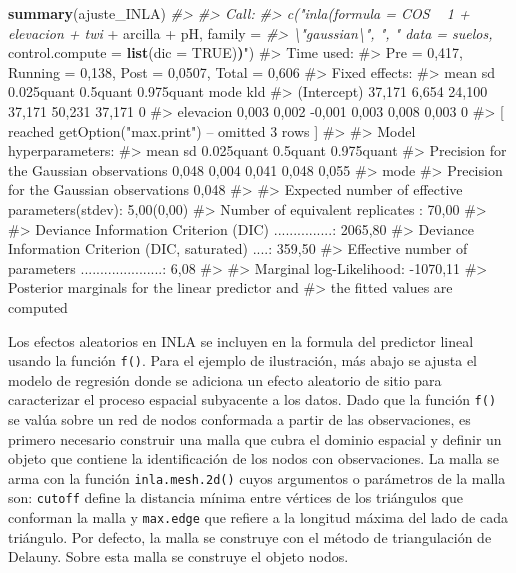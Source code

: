 \documentclass[11pt,b5paper,]{krantz}
\newenvironment{Shaded}{}{}
\newcommand{\KeywordTok}[1]{\textcolor[rgb]{0.00,0.44,0.13}{\textbf{#1}}}
\newcommand{\DataTypeTok}[1]{\textcolor[rgb]{0.56,0.13,0.00}{#1}}
\newcommand{\StringTok}[1]{\textcolor[rgb]{0.25,0.44,0.63}{#1}}
\newcommand{\CommentTok}[1]{\textcolor[rgb]{0.38,0.63,0.69}{\textit{#1}}}
\newcommand{\OtherTok}[1]{\textcolor[rgb]{0.00,0.44,0.13}{#1}}
\newcommand{\OperatorTok}[1]{\textcolor[rgb]{0.40,0.40,0.40}{#1}}
\newcommand{\ErrorTok}[1]{\textcolor[rgb]{1.00,0.00,0.00}{\textbf{#1}}}
\newcommand{\NormalTok}[1]{#1}
\begin{document}
\begin{Shaded}
\begin{Highlighting}[]
\KeywordTok{summary}\NormalTok{(ajuste_INLA)}
\CommentTok{#>}
\CommentTok{#> Call:}
\CommentTok{#> c("inla(formula = COS ~ 1 + elevacion + twi}
\OperatorTok{+}\StringTok{ }\NormalTok{arcilla }\OperatorTok{+}\StringTok{ }\NormalTok{pH, family =}
\CommentTok{#> \textbackslash{}"gaussian\textbackslash{}", ", " data = suelos,}
\NormalTok{control.compute =}\StringTok{ }\KeywordTok{list}\NormalTok{(}\DataTypeTok{dic =} \OtherTok{TRUE}\NormalTok{)}\ErrorTok{)}\StringTok{")}
\StringTok{#> Time used:}
\StringTok{#> Pre = 0,417, Running = 0,138, Post = 0,0507,}
\StringTok{Total = 0,606}
\StringTok{#> Fixed effects:}
\StringTok{#> mean sd 0.025quant 0.5quant 0.975quant mode}
\StringTok{kld}
\StringTok{#> (Intercept) 37,171 6,654 24,100 37,171}
\StringTok{50,231 37,171 0}
\StringTok{#> elevacion 0,003 0,002 -0,001 0,003 0,008}
\StringTok{0,003 0}
\StringTok{#> [ reached getOption("}\NormalTok{max.print}\StringTok{") -- omitted}
\StringTok{3 rows ]}
\StringTok{#>}
\StringTok{#> Model hyperparameters:}
\StringTok{#> mean sd 0.025quant 0.5quant 0.975quant}
\StringTok{#> Precision for the Gaussian observations}
\StringTok{0,048 0,004 0,041 0,048 0,055}
\StringTok{#> mode}
\StringTok{#> Precision for the Gaussian observations}
\StringTok{0,048}
\StringTok{#>}
\StringTok{#> Expected number of effective}
\StringTok{parameters(stdev): 5,00(0,00)}
\StringTok{#> Number of equivalent replicates : 70,00}
\StringTok{#>}
\StringTok{#> Deviance Information Criterion (DIC)}
\StringTok{...............: 2065,80}
\StringTok{#> Deviance Information Criterion (DIC,}
\StringTok{saturated) ....: 359,50}
\StringTok{#> Effective number of parameters}
\StringTok{.....................: 6,08}
\StringTok{#>}
\StringTok{#> Marginal log-Likelihood: -1070,11}
\StringTok{#> Posterior marginals for the linear predictor}
\StringTok{and}
\StringTok{#> the fitted values are computed}
\end{Highlighting}
\end{Shaded}

Los efectos aleatorios en INLA se incluyen en la formula del predictor
lineal usando la función \texttt{f()}. Para el ejemplo de ilustración,
más abajo se ajusta el modelo de regresión donde se adiciona un efecto
aleatorio de sitio para caracterizar el proceso espacial subyacente a
los datos. Dado que la función \texttt{f()} se valúa sobre un red de
nodos conformada a partir de las observaciones, es primero necesario
construir una malla que cubra el dominio espacial y definir un objeto
que contiene la identificación de los nodos con observaciones. La malla
se arma con la función \texttt{inla.mesh.2d()} cuyos argumentos o
parámetros de la malla son: \texttt{cutoff} define la distancia mínima
entre vértices de los triángulos que conforman la malla y
\texttt{max.edge} que refiere a la longitud máxima del lado de cada
triángulo. Por defecto, la malla se construye con el método de
triangulación de Delauny. Sobre esta malla se construye el objeto nodos.
\end{document}
